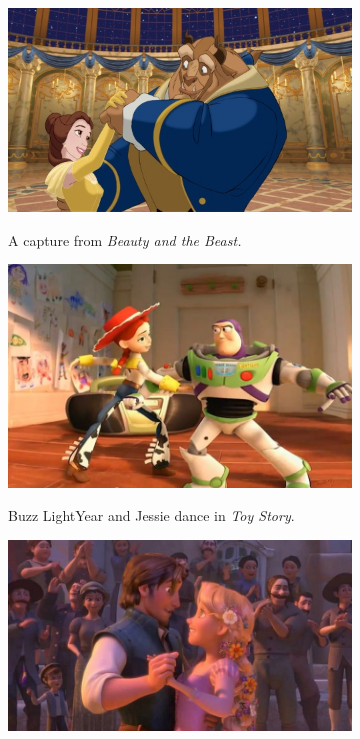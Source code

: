 \begin{figure}[h!]
	\centering
        \begin{subfigure}[b!]{0.3\textwidth}
        	\centering
                \includegraphics[width=\linewidth]{img/belleetlabete}
                \label{fig:belle}
                \caption{A capture from \textit{Beauty and the Beast.}}
        \end{subfigure}
        \quad
        \begin{subfigure}[b!]{0.3\textwidth}
        	\centering
                \includegraphics[width=\linewidth]{img/buzz-and-jessie}
                \label{fig:toystory}
                \caption{Buzz LightYear and Jessie dance in \textit{Toy Story}.}
        \end{subfigure}%
        \quad
        \begin{subfigure}[b!]{0.3\textwidth}
        	\centering
                \includegraphics[width=\linewidth]{img/tangled}

\end{subfigure}
\end{figure}
